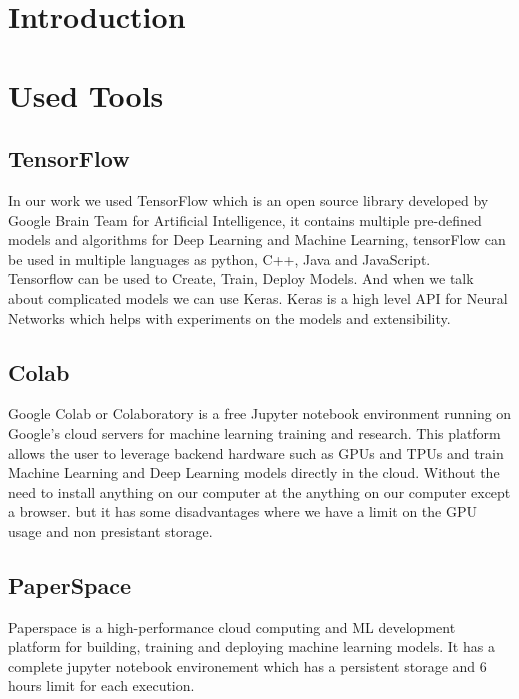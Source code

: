 \section{Introduction}
\vspace{0.2in}
\hspace*{0.16in}

\section{Used Tools}
\vspace{0.2in}
\hspace*{0.16in}


\subsection{TensorFlow}
In our work we used TensorFlow which is an open source library developed by Google Brain Team for Artificial Intelligence, it contains multiple pre-defined models and algorithms for Deep Learning and Machine Learning, tensorFlow can be used in multiple languages as python, C++, Java and JavaScript.\\
Tensorflow can be used to Create, Train, Deploy Models. And when we talk about complicated models we can use Keras.
Keras is a high level API for Neural Networks which helps with experiments on the models and extensibility.

\subsection{Colab}
Google Colab or Colaboratory is a free Jupyter notebook environment running on Google's cloud servers for machine learning training and research. This platform allows the user to leverage backend hardware such as GPUs and TPUs and train Machine Learning and Deep Learning models directly in the cloud. Without the need to install anything on our computer at the anything on our computer except a browser.
but it has some disadvantages where we have a limit on the GPU usage
and non presistant storage.

\subsection{PaperSpace}
Paperspace is a high-performance cloud computing and ML development platform for building, training and deploying machine learning models. It has a complete jupyter notebook environement which has a persistent storage and 6 hours limit for each execution.


